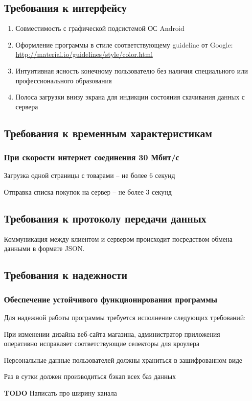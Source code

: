 \subsection{Требования к интерфейсу}
\begin{enumerate}
\item Совместимость с графической подсистемой ОС Android {\textregistered}
\item Оформление программы в стиле соответствующему guideline от Google: \url{http://material.io/guidelines/style/color.html}
\item Интуитивная ясность конечному пользователю без наличия специального или профессионального образования
\item Полоса загрузки внизу экрана для индикции состояния скачивания данных с сервера
\end{enumerate}


\subsection{Требования к временным характеристикам}

\subsubsection{При скорости интернет соединения 30 Мбит/с}
\begin{my_enumerate}
\item Загрузка одной страницы с товарами -- не более 6 секунд
\item Отправка списка покупок на сервер -- не более 3 секунд
\end{my_enumerate}


\subsection{Требования к протоколу передачи данных}

Коммуникация между клиентом и сервером происходит посредством обмена данными в формате JSON.

\subsection{Требования к надежности}
\subsubsection{Обеспечение устойчивого функционирования программы}

Для надежной работы программы требуется исполнение следующих требований:
\begin{my_enumerate}
\item При изменении дизайна веб-сайта магазина, администратор приложения оперативно
исправляет соответствующие селекторы для кроулера
\item Персональные данные пользователей должны храниться в зашифрованном виде
\item Раз в сутки должен производиться бэкап всех баз данных
\end{my_enumerate}
\textbf{TODO} Написать про ширину канала \\
